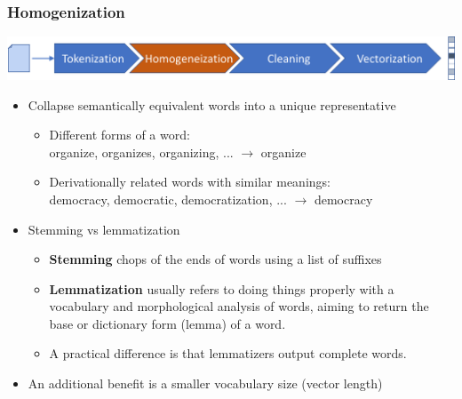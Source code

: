 \documentclass{beamer}
\begin{document}
\begin{frame}

    \frametitle{Homogenization}

    \centerline{\includegraphics[width=\textwidth]{./figs/NLPTM_homogenization.png}}

    \begin{itemize}
    	\item Collapse semantically equivalent words into a unique representative
    		\begin{itemize}
    			\item Different forms of a word: \\ 
    			organize, organizes, organizing, ... $\rightarrow$ organize 
    			\item Derivationally related words with similar meanings: \\ democracy, democratic, democratization, ... $\rightarrow$ democracy
    		\end{itemize}
    		
    	\item Stemming vs lemmatization
    		\begin{itemize}
    			\item {\bf Stemming} chops of the ends of words using a list of suffixes
    			\item {\bf Lemmatization} usually refers to doing things properly with a vocabulary and morphological analysis of words, aiming to return the base or dictionary form (lemma) of a word. 
				\item A practical difference is that lemmatizers output complete words.

    		\end{itemize}
    		
    	
    	\item An additional benefit is a smaller vocabulary size (vector length)
    	
    \end{itemize}
    
\end{frame}
\end{document}
